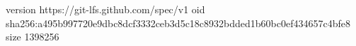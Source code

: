 version https://git-lfs.github.com/spec/v1
oid sha256:a495b997720e9dbc8dcf3332ceb3d5c18c8932bdded1b60bc0ef434657c4bfe8
size 1398256
